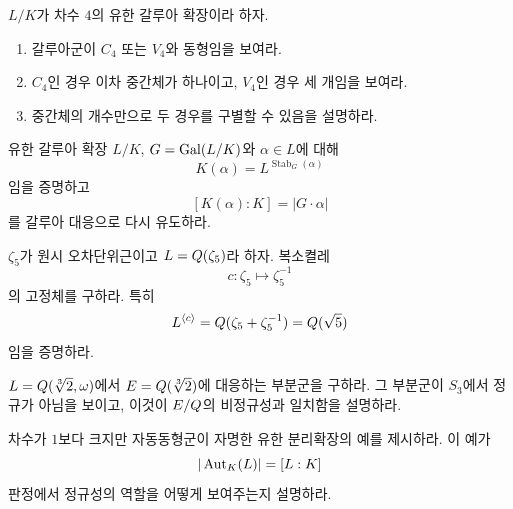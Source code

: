 \begin{exercise}
$L/K$가 차수 $4$의 유한 갈루아 확장이라 하자.
\begin{enumerate}[label=(\alph*)]
  \item 갈루아군이 $C_4$ 또는 $V_4$와 동형임을 보여라.
  \item $C_4$인 경우 이차 중간체가 하나이고, $V_4$인 경우 세 개임을 보여라.
  \item 중간체의 개수만으로 두 경우를 구별할 수 있음을 설명하라.
\end{enumerate}
\end{exercise}

\begin{exercise}
유한 갈루아 확장 $L/K$, $G=\operatorname{Gal}(L/K)$와 $\alpha\in L$에 대해
\[
  K(\alpha)=L^{\operatorname{Stab}_G(\alpha)}
\]
임을 증명하고
\[
  [K(\alpha):K]=|G\cdot\alpha|
\]
를 갈루아 대응으로 다시 유도하라.
\end{exercise}

\begin{exercise}[*]
$\zeta_5$가 원시 오차단위근이고 $L=Q(\zeta_5)$라 하자. 복소켤레
\[
  c:\zeta_5\longmapsto\zeta_5^{-1}
\]
의 고정체를 구하라. 특히
\[
  L^{\langle c\rangle}
  =Q(\zeta_5+\zeta_5^{-1})
  =Q(\sqrt5)
\]
임을 증명하라.
\end{exercise}

\begin{exercise}
$L=Q(\sqrt[3]{2},\omega)$에서 $E=Q(\sqrt[3]{2})$에 대응하는 부분군을 구하라. 그 부분군이 $S_3$에서 정규가 아님을 보이고, 이것이 $E/Q$의 비정규성과 일치함을 설명하라.
\end{exercise}

\begin{exercise}
차수가 $1$보다 크지만 자동동형군이 자명한 유한 분리확장의 예를 제시하라. 이 예가
\[
  |\operatorname{Aut}_K(L)|=[L:K]
\]
판정에서 정규성의 역할을 어떻게 보여주는지 설명하라.
\end{exercise}
